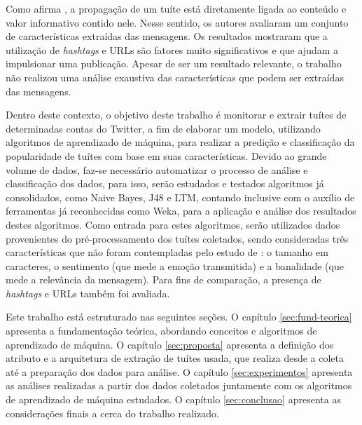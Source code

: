\documentclass[oneside,openright,12pt]{ufsm_2015} %
\begin{document}
{    \par Como afirma \cite{ieee:suh:10}, a propagação de um tuíte está diretamente ligada ao conteúdo e valor informativo contido nele. Nesse sentido, os autores avaliaram um conjunto de características extraídas das mensagens. Os resultados mostraram que a utilização de \textit{hashtags} e URLs são fatores muito significativos e que ajudam a impulsionar uma publicação. Apesar de ser um resultado relevante, o trabalho não realizou uma análise exaustiva das características que podem ser extraídas das mensagens.

    \par Dentro deste contexto, o objetivo deste trabalho é monitorar e extrair tuítes de determinadas contas do Twitter, a fim de elaborar um modelo, utilizando algoritmos de aprendizado de máquina, para realizar a predição e classificação da popularidade de tuítes com base em suas características. Devido ao grande volume de dados, faz-se necessário automatizar o processo de análise e classificação dos dados, para isso, serão estudados e testados algoritmos já consolidados, como Naive Bayes, J48 e LTM, contando inclusive com o auxílio de ferramentas já reconhecidas como Weka, para a aplicação e análise dos resultados destes algoritmos. Como entrada para estes algoritmos, serão utilizados dados provenientes do pré-processamento dos tuítes coletados, sendo consideradas três características que não foram contempladas pelo estudo de \cite{ieee:suh:10}: o tamanho em caracteres, o sentimento (que mede a emoção transmitida) e a banalidade (que mede a relevância da mensagem). Para fins de comparação, a presença de \textit{hashtags} e URLs também foi avaliada.

    \par Este trabalho está estruturado nas seguintes seções. O capítulo \ref{sec:fund-teorica} apresenta a fundamentação teórica, abordando conceitos e algoritmos de aprendizado de máquina. O capítulo \ref{sec:proposta} apresenta a definição dos atributo e a arquitetura de extração de tuítes usada, que realiza desde a coleta até a preparação dos dados para análise. O capítulo \ref{sec:experimentos} apresenta as análises realizadas a partir dos dados coletados juntamente com os algoritmos de aprendizado de máquina estudados. O capítulo \ref{sec:conclusao} apresenta as considerações finais a cerca do trabalho realizado.


}
\geraintro  %
\end{document}
